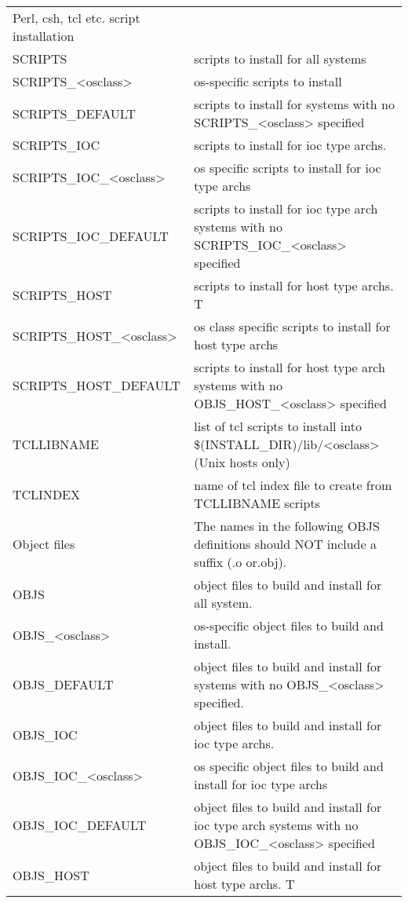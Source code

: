 \begin{center}
\begin{longtable}{p{2.94784in}p{3.76247in}}
Perl, csh, tcl etc. script installation &    \\
SCRIPTS & scripts to install for all systems\\
SCRIPTS\_\textless{}osclass\textgreater{} & os-specific scripts to install\\
SCRIPTS\_DEFAULT & scripts to install for systems with no SCRIPTS\_\textless{}osclass\textgreater{} specified\\
SCRIPTS\_IOC & scripts to install for ioc type archs.\\
SCRIPTS\_IOC\_\textless{}osclass\textgreater{} & os specific scripts to install for ioc type archs\\
SCRIPTS\_IOC\_DEFAULT & scripts to install for ioc type arch systems with no SCRIPTS\_IOC\_\textless{}osclass\textgreater{} specified\\
SCRIPTS\_HOST & scripts to install for host type archs. T\\
SCRIPTS\_HOST\_\textless{}osclass\textgreater{} & os class specific scripts to install for host type archs\\
SCRIPTS\_HOST\_DEFAULT & scripts to install for host type arch systems with no OBJS\_HOST\_\textless{}osclass\textgreater{} specified\\
TCLLIBNAME & list of tcl scripts to install into \$(INSTALL\_DIR)/lib/\textless{}osclass\textgreater{} (Unix hosts only)\\
TCLINDEX & name of tcl index file to create from TCLLIBNAME scripts\\
Object files & The names in the following OBJS definitions should NOT include a suffix (.o or.obj).\\
OBJS & object files to build and install for all system. \\
OBJS\_\textless{}osclass\textgreater{} & os-specific object files to build and install. \\
OBJS\_DEFAULT & object files to build and install for systems with no OBJS\_\textless{}osclass\textgreater{} specified.\\
OBJS\_IOC & object files to build and install for ioc type archs.\\
OBJS\_IOC\_\textless{}osclass\textgreater{} & os specific object files to build and install for ioc type archs\\
OBJS\_IOC\_DEFAULT & object files to build and install for ioc type arch systems with no OBJS\_IOC\_\textless{}osclass\textgreater{} specified\\
OBJS\_HOST & object files to build and install for host type archs. T\\

\end{longtable}
\end{center}
